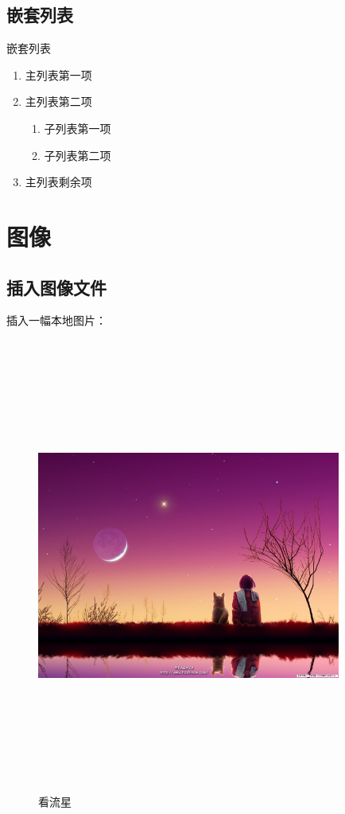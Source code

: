 \documentclass[a4paper,12pt]{article} %
\begin{document}
 \subsection{嵌套列表}
 嵌套列表
 \begin{enumerate}
 \item 主列表第一项
 \item 主列表第二项
   \begin{enumerate}
   \item 子列表第一项
   \item 子列表第二项
   \end{enumerate}
   \item 主列表剩余项
 \end{enumerate}
 

\section{图像}

\subsection{插入图像文件}
插入一幅本地图片：\\
\begin{figure}[htbp] %
  \centering
  \includegraphics[width=10cm,height=15cm,keepaspectratio]{pic1.jpg}
  \caption{看流星}
  \label{fig:star1}
\end{figure}
\end{document}
